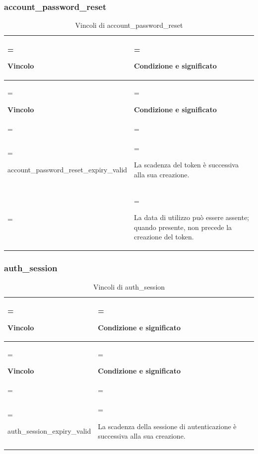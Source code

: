 \documentclass[11pt,a4paper]{article}
\begin{document}
\subsubsection{account\_password\_reset}
{\small\renewcommand{\arraystretch}{1.25}
\begin{xltabular}{\linewidth}{>{\hsize\linewidth=\hsize\raggedright\arraybackslash}X>{\hsize\linewidth=\hsize\raggedright\arraybackslash}X}
\caption{Vincoli di account\_password\_reset}\label{tab:dictionary-28}\\
\toprule
\textbf{Vincolo} & \textbf{Condizione e significato}\\\midrule\endfirsthead\toprule\textbf{Vincolo} & \textbf{Condizione e significato}\\\midrule\endhead
\midrule{}\\\endfoot\bottomrule\endlastfoot

{\ttfamily\small account\_\allowbreak{}password\_\allowbreak{}reset\_\allowbreak{}expiry\_\allowbreak{}valid} & La scadenza del token è successiva alla sua creazione.\\ & La data di utilizzo può essere assente; quando presente, non precede la creazione del token.\\*
\end{xltabular}}

\subsubsection{auth\_session}
{\small\renewcommand{\arraystretch}{1.25}
\begin{xltabular}{\linewidth}{>{\hsize\linewidth=\hsize\raggedright\arraybackslash}X>{\hsize\linewidth=\hsize\raggedright\arraybackslash}X}
\caption{Vincoli di auth\_session}\label{tab:dictionary-29}\\
\toprule
\textbf{Vincolo} & \textbf{Condizione e significato}\\\midrule\endfirsthead\toprule\textbf{Vincolo} & \textbf{Condizione e significato}\\\midrule\endhead
\midrule{}\\\endfoot\bottomrule\endlastfoot

{\ttfamily\small auth\_\allowbreak{}session\_\allowbreak{}expiry\_\allowbreak{}valid} & La scadenza della sessione di autenticazione è successiva alla sua creazione.\\*
\end{xltabular}}
\end{document}
